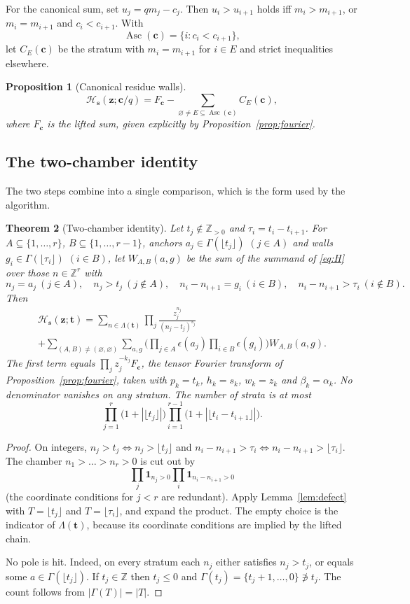 \documentclass[11pt]{amsart}
\newtheorem{theorem}{Theorem}[section]
\newtheorem{proposition}[theorem]{Proposition}
\theoremstyle{definition}
\theoremstyle{remark}
\numberwithin{equation}{section}
\newcommand{\Z}{\mathbb{Z}}
\newcommand{\Asc}{\operatorname{Asc}}
\newcommand{\one}{\mathbf{1}}
\newcommand{\s}{\mathbf{s}}
\newcommand{\z}{\mathbf{z}}
\newcommand{\tb}{\mathbf{t}}
\newcommand{\cb}{\mathbf{c}}
\newcommand{\Hs}{\mathcal{H}}
\newcommand{\lfl}{\lfloor}
\newcommand{\rfl}{\rfloor}
\begin{document}
For the canonical sum, set $u_j=qm_j-c_j$. Then $u_i>u_{i+1}$ holds iff $m_i>m_{i+1}$, or $m_i=m_{i+1}$ and $c_i<c_{i+1}$. With
\[
\Asc(\cb)=\{i:c_i<c_{i+1}\},
\]
let $C_E(\cb)$ be the stratum with $m_i=m_{i+1}$ for $i\in E$ and strict inequalities elsewhere.

\begin{proposition}[Canonical residue walls]\label{prop:residue}
\[
\Hs_\s(\z;\cb/q)=F_\cb-\sum_{\varnothing\ne E\subseteq\Asc(\cb)}C_E(\cb),
\]
where $F_\cb$ is the lifted sum, given explicitly by Proposition~\ref{prop:fourier}.
\end{proposition}

\subsection{The two-chamber identity}
The two steps combine into a single comparison, which is the form used by the algorithm.

\begin{theorem}[Two-chamber identity]\label{thm:twochamber}
Let $t_j\notin\Z_{>0}$ and $\tau_i=t_i-t_{i+1}$. For $A\subseteq\{1,\dots,r\}$, $B\subseteq\{1,\dots,r-1\}$, anchors $a_j\in\Gamma(\lfl t_j\rfl)$ $(j\in A)$ and walls $g_i\in\Gamma(\lfl\tau_i\rfl)$ $(i\in B)$, let $W_{A,B}(a,g)$ be the sum of the summand of \eqref{eq:H} over those $n\in\Z^r$ with
\[
n_j=a_j\ (j\in A),\quad n_j>t_j\ (j\notin A),\quad n_i-n_{i+1}=g_i\ (i\in B),\quad n_i-n_{i+1}>\tau_i\ (i\notin B).
\]
Then
\begin{multline}\label{eq:twochamber}
\Hs_\s(\z;\tb)=\sum_{n\in\Lambda(\tb)}\prod_j\frac{z_j^{n_j}}{(n_j-t_j)^{s_j}}\\
+\sum_{(A,B)\ne(\varnothing,\varnothing)}\sum_{a,g}\Big(\prod_{j\in A}\epsilon(a_j)\prod_{i\in B}\epsilon(g_i)\Big)W_{A,B}(a,g).
\end{multline}
The first term equals $\prod_jz_j^{-k_j}F_\cb$, the tensor Fourier transform of Proposition~\ref{prop:fourier}, taken with $p_k=t_k$, $h_k=s_k$, $w_k=z_k$ and $\beta_k=\alpha_k$. No denominator vanishes on any stratum. The number of strata is at most
\begin{equation}\label{eq:count}
\prod_{j=1}^r\big(1+|\lfl t_j\rfl|\big)\prod_{i=1}^{r-1}\big(1+|\lfl t_i-t_{i+1}\rfl|\big).
\end{equation}
\end{theorem}

\begin{proof}
On integers, $n_j>t_j\iff n_j>\lfl t_j\rfl$ and $n_i-n_{i+1}>\tau_i\iff n_i-n_{i+1}>\lfl\tau_i\rfl$. The chamber $n_1>\dots>n_r>0$ is cut out by
\[
\prod_j\one_{n_j>0}\prod_i\one_{n_i-n_{i+1}>0}
\]
(the coordinate conditions for $j<r$ are redundant). Apply Lemma~\ref{lem:defect} with $T=\lfl t_j\rfl$ and $T=\lfl\tau_i\rfl$, and expand the product. The empty choice is the indicator of $\Lambda(\tb)$, because its coordinate conditions are implied by the lifted chain.

No pole is hit. Indeed, on every stratum each $n_j$ either satisfies $n_j>t_j$, or equals some $a\in\Gamma(\lfl t_j\rfl)$. If $t_j\in\Z$ then $t_j\le0$ and $\Gamma(t_j)=\{t_j+1,\dots,0\}\not\ni t_j$. The count follows from $|\Gamma(T)|=|T|$.
\end{proof}
\end{document}

